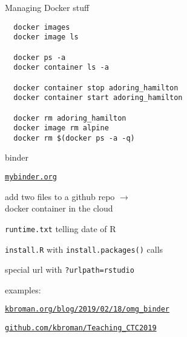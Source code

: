 \documentclass[aspectratio=169,12pt,t]{beamer}
\begin{document}
\begin{frame}[fragile,c]{Managing Docker stuff}

\begin{lstlisting}
  docker images
  docker image ls

  docker ps -a
  docker container ls -a

  docker container stop adoring_hamilton
  docker container start adoring_hamilton

  docker rm adoring_hamilton
  docker image rm alpine
  docker rm $(docker ps -a -q)
\end{lstlisting}

\end{frame}






\begin{frame}{binder}

  \bbi
\item \href{https://mybinder.org}{\tt mybinder.org}
\item add two files to a github repo $\rightarrow$ \\
  docker container in the cloud
  \bi
\item {\tt runtime.txt} telling date of R
\item {\tt install.R} with {\tt install.packages()} calls
\item special url with {\tt ?urlpath=rstudio}
  \ei
\item examples:
  \bi
\item \href{https://kbroman.org/blog/2019/02/18/omg_binder/}{\tt kbroman.org/blog/2019/02/18/omg\_binder}
\item \href{https://github.com/kbroman/Teaching_CTC2019}{\tt github.com/kbroman/Teaching\_CTC2019}
  \ei

  \ei

\end{frame}
\end{document}
